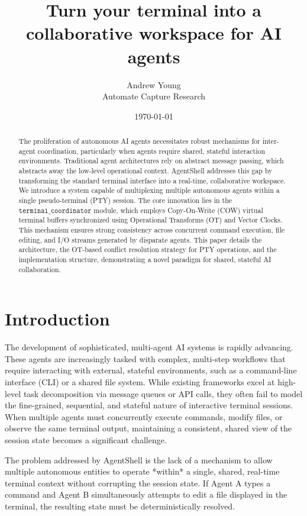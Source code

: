 \documentclass[11pt,a4paper]{article}
\title{Turn your terminal into a collaborative workspace for AI agents}
\author{Andrew Young \\ Automate Capture Research}
\date{\today}
\begin{document}
\maketitle

\begin{abstract}
The proliferation of autonomous AI agents necessitates robust mechanisms for inter-agent coordination, particularly when agents require shared, stateful interaction environments. Traditional agent architectures rely on abstract message passing, which abstracts away the low-level operational context. AgentShell addresses this gap by transforming the standard terminal interface into a real-time, collaborative workspace. We introduce a system capable of multiplexing multiple autonomous agents within a single pseudo-terminal (PTY) session. The core innovation lies in the $\texttt{terminal\_coordinator}$ module, which employs Copy-On-Write (COW) virtual terminal buffers synchronized using Operational Transforms (OT) and Vector Clocks. This mechanism ensures strong consistency across concurrent command execution, file editing, and I/O streams generated by disparate agents. This paper details the architecture, the OT-based conflict resolution strategy for PTY operations, and the implementation structure, demonstrating a novel paradigm for shared, stateful AI collaboration.
\end{abstract}

\section{Introduction}
The development of sophisticated, multi-agent AI systems is rapidly advancing. These agents are increasingly tasked with complex, multi-step workflows that require interacting with external, stateful environments, such as a command-line interface (CLI) or a shared file system. While existing frameworks excel at high-level task decomposition via message queues or API calls, they often fail to model the fine-grained, sequential, and stateful nature of interactive terminal sessions. When multiple agents must concurrently execute commands, modify files, or observe the same terminal output, maintaining a consistent, shared view of the session state becomes a significant challenge.

The problem addressed by AgentShell is the lack of a mechanism to allow multiple autonomous entities to operate *within* a single, shared, real-time terminal context without corrupting the session state. If Agent A types a command and Agent B simultaneously attempts to edit a file displayed in the terminal, the resulting state must be deterministically resolved.
\end{document}
